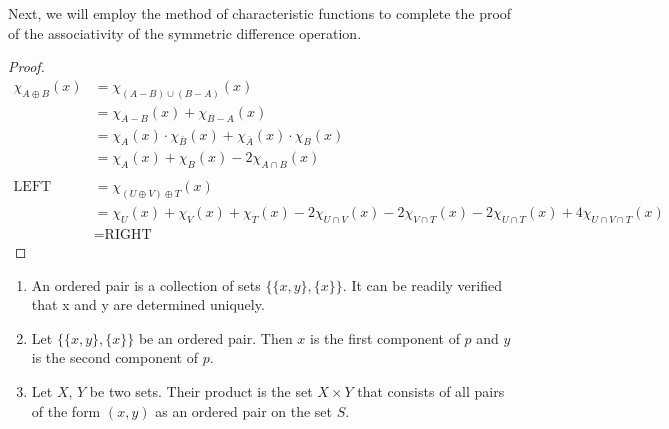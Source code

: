 \documentclass[../main.tex]{subfiles}
\begin{document}
Next, we will employ the method of characteristic functions to complete the proof of the associativity of the symmetric difference operation.

\begin{proof}
\begin{align*}
    \chi_{A\oplus B}(x)&=\chi_{(A-B)\cup(B-A)}(x)\\
    &=\chi_{A-B}(x)+\chi_{B-A}(x)\\
    &=\chi_{A}(x)\cdot\chi_{\bar B}(x)+\chi_{\bar A}(x)\cdot\chi_{B}(x)\\
    &=\chi_A(x)+\chi_B(x)-2\chi_{A\cap B}(x)\\
    \\
    \text{LEFT}&=\chi_{(U\oplus V)\oplus T}(x)\\
    &=\chi_U(x)+\chi_V(x)+\chi_T(x)-2\chi_{U\cap V}(x)-2\chi_{V\cap T}(x)-2\chi_{U\cap T}(x)+4\chi_{U\cap V \cap T}(x)\\
    &=\text{RIGHT}
\end{align*}
\end{proof}

\begin{purple}
\begin{definition}
\begin{enumerate}
    \item An ordered pair is a collection of sets $\{\{x,y\},\{x\}\}$. It can be readily verified that x and y are determined uniquely.
    \item Let $\{\{x,y\},\{x\}\}$ be an ordered pair. Then $x$ is the first component of $p$ and $y$ is the second component of $p$.
    \item Let $X$, $Y$ be two sets. Their product is the set $X\times Y$ that consists of all pairs of the form $(x, y)$ as an ordered pair on the set $S$.
\end{enumerate}
\end{definition}
\end{purple}
\end{document}
